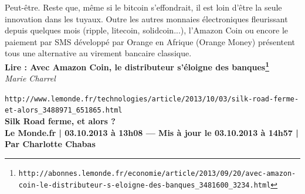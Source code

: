 \documentclass[11pt,twoside,a4paper]{article}
\begin{document}
Peut-{\^e}tre. Reste que, m{\^e}me si le bitcoin s'effondrait, il est loin d'{\^e}tre la seule innovation dans les tuyaux. Outre les autres monnaies {\'e}lectroniques fleurissant depuis quelques mois (ripple, litecoin, solidcoin...), l'Amazon Coin ou encore le paiement par SMS d{\'e}velopp{\'e} par Orange en Afrique (Orange Money) pr{\'e}sentent tous une alternative au virement bancaire classique. ~\\

\textbf{Lire : Avec Amazon Coin, le distributeur s'{\'e}loigne des banques\footnote{\texttt{http://abonnes.lemonde.fr/economie/article/2013/09/20/avec-amazon-coin-le-distributeur-s-eloigne-des-banques\_3481600\_3234.html}}}~\\

\emph{Marie Charrel}~\\


\clearpage

\texttt{http://www.lemonde.fr/technologies/article/2013/10/03/silk-road-ferme-et-alors\_3488971\_651865.html}~\\

\textbf{Silk Road ferme, et alors ?}~\\

\textbf{\small Le Monde.fr | 03.10.2013 {\`a} 13h08 --- Mis {\`a} jour le 03.10.2013 {\`a} 14h57 | Par \textbf{Charlotte Chabas} }~\\
\end{document}
